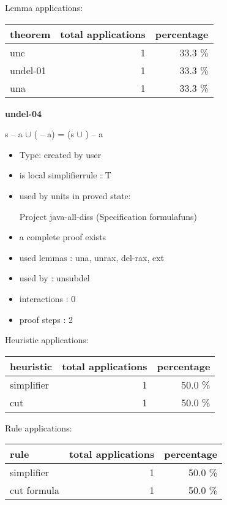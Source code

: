 \documentclass[a4paper]{article}
\begin{document}
Lemma applications:

\begin{supertabular}{l|r|r}
theorem	        & total applications & percentage \\ \hline
unc & 1 & 33.3 \% \\
undel-01 & 1 & 33.3 \% \\
una & 1 & 33.3 \% \\

\end{supertabular}
\pagebreak

{\LARGE\bf undel-04}\label{lemma-undel-04}

\medskip

 \Fol s -- a $\cup$ ( -- a) = (s $\cup$ ) -- a

\begin{itemize}

\item Type: created by user

\item is local simplifierrule : T
\item used by units in proved state:

Project java-all-diss (Specification formulafuns)
\item       a complete proof exists
\item       used lemmas  : una, unrax, del-rax, ext
\item       used by      : unsubdel
\item       interactions : 0
\item       proof steps  : 2
\end{itemize}

\medskip


Heuristic applications:

\begin{supertabular}{l|r|r}
heuristic	& total applications & percentage \\ \hline
simplifier & 1 & 50.0 \% \\
cut & 1 & 50.0 \% \\

\end{supertabular}

Rule applications:

\begin{supertabular}{l|r|r}
rule	        & total applications & percentage \\ \hline
simplifier & 1 & 50.0 \% \\
cut formula & 1 & 50.0 \% \\

\end{supertabular}
\end{document}
